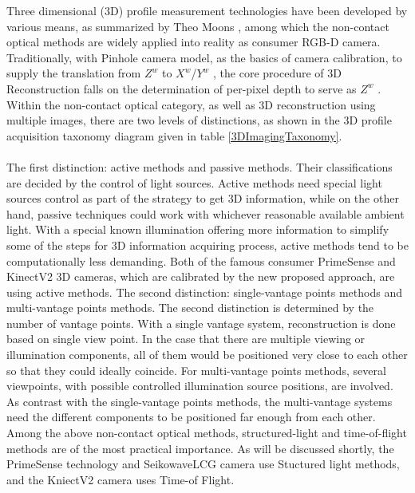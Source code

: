%
\noindent
Three dimensional (3D) profile measurement technologies have been developed by various means, as summarized by Theo Moons \cite{CourseNotes}, among which the non-contact optical methods are widely applied into reality as consumer RGB-D camera. Traditionally, with Pinhole camera model, as the basics of camera calibration, to supply the translation from \(Z^{w}\)  to \(X^{w}\)/\(Y^{w}\) , the core procedure of 3D Reconstruction falls on the determination of per-pixel depth to serve as \(Z^{w}\) .%
Within the non-contact optical category, as well as 3D reconstruction using multiple images, there are two levels of distinctions, as shown in the 3D profile acquisition taxonomy diagram \cite{Reconstruction10} given in table \ref{3DImagingTaxonomy}. 
\\\\%
The first distinction: active methods and passive methods. Their classifications are decided by the control of light sources. Active methods need special light sources control as part of the strategy to get 3D information, while on the other hand, passive techniques could work with whichever reasonable available ambient light. With a special known illumination offering more information to simplify some of the steps for 3D information acquiring process, active methods tend to be computationally less demanding. Both of the famous consumer PrimeSense and KinectV2 3D cameras, which are calibrated by the new proposed approach, are using active methods.
The second distinction: single-vantage points methods and multi-vantage points methods. The second distinction is determined by the number of vantage points. With a single vantage system, reconstruction is done based on single view point. In the case that there are multiple viewing or illumination components, all of them would be positioned very close to each other so that they could ideally coincide. For multi-vantage points methods, several viewpoints, with possible controlled illumination source positions, are involved. As contrast with the single-vantage points methods, the multi-vantage systems need the different components to be positioned far enough from each other. 
Among the above non-contact optical methods, structured-light and time-of-flight methods are of the most practical importance.
As will be discussed shortly, the PrimeSense technology and SeikowaveLCG camera use Stuctured light methods, and the KniectV2 camera uses Time-of Flight. 
